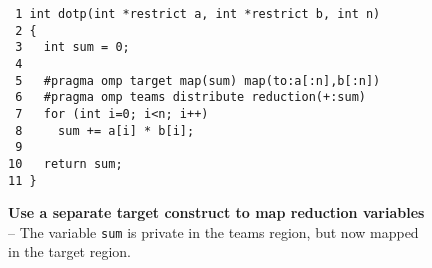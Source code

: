 \begin{figure*}[!tbh]
\begin{verbatim}
 1 int dotp(int *restrict a, int *restrict b, int n)
 2 {
 3   int sum = 0;
 4 
 5   #pragma omp target map(sum) map(to:a[:n],b[:n])
 6   #pragma omp teams distribute reduction(+:sum)
 7   for (int i=0; i<n; i++)
 8     sum += a[i] * b[i];
 9 
10   return sum;
11 }
\end{verbatim}
\caption{ \textbf {Use a separate target construct to map reduction variables} -- \small
          The variable \texttt{sum} is private in the teams region, but now mapped
          in the target region.
        }
\label{figure:chapter6-targetteams-reduction-v2}
\end{figure*}
